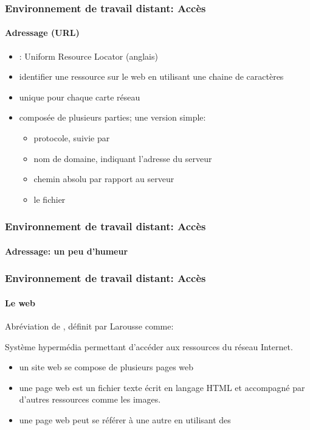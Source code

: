 \documentclass[xcolor=table]{beamer}
\begin{document}
\begin{frame}
\frametitle{Environnement de travail distant: Accès}
\framesubtitle{Adressage (URL)}

\begin{itemize}
	\item {}: Uniform Resource Locator (anglais)
	\item identifier une ressource sur le web en utilisant une chaine de caractères
	\item unique pour chaque carte réseau  
	\item composée de plusieurs parties; une version simple: 
	\begin{itemize}
		\item protocole, suivie par \keyword{://}
		\item nom de domaine, indiquant l'adresse du serveur
		\item chemin absolu par rapport au serveur 
		\item le fichier 
	\end{itemize}
\end{itemize}


\end{frame}

\begin{frame}
\frametitle{Environnement de travail distant: Accès}
\framesubtitle{Adressage: un peu d'humeur}

\begin{center}
\end{center}


\end{frame}

%
%
%
%


\begin{frame}
\frametitle{Environnement de travail distant: Accès}
\framesubtitle{Le web}

Abréviation de , définit par Larousse comme:
\begin{definition}
	Système hypermédia permettant d'accéder aux ressources du réseau Internet.
\end{definition}

\begin{itemize}
	\item un site web se compose de plusieurs pages web
	\item une page web est un fichier texte écrit en langage HTML et accompagné par d'autres ressources comme les images. 
	\item une page web peut se référer à une autre en utilisant des  
\end{itemize}

\end{frame}
\end{document}
